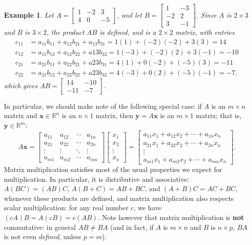 \documentclass[12pt,letterpaper]{article}
\newtheorem{eg}[theorem]{Example}
\newenvironment{example}{\begin{eg}\rm}{\end{eg}}
\newcommand{\R}{\mathbb{R}}
\newcommand{\x}{\mathbf{x}}
\newcommand{\y}{\mathbf{y}}
\newcommand{\di}{\displaystyle}
\begin{document}
\begin{example}
Let $\di A = \begin{bmatrix}
1&-2&3\\4&0&-5
\end{bmatrix}$, and let $\di B = \begin{bmatrix}
1&-3\\-2&2\\3&-1
\end{bmatrix}$. Since $A$ is $2\times 3$ and $B$ is $3\times 2$, the product $AB$ is defined, and is a $2\times 2$ matrix, with entries
\begin{align*}
c_{11} & = a_{11}b_{11}+a_{12}b_{21}+a_{13}b_{31} = 1(1)+(-2)(-2)+3(3) = 14\\
c_{12} & = a_{11}b_{12}+a_{12}b_{22}+a{13}b_{32} = 1(-3)+(-2)(2)+3(-1) = -10\\
c_{21} & = a_{21}b_{11}+a_{22}b_{21}+a{23}b_{31} = 4(1)+0(-2)+(-5)(3) = -11\\
c_{22} & = a_{21}b_{12}+a_{22}b_{22}+a{23}b_{32} = 4(-3)+0(2)+(-5)(-1) = -7,
\end{align*}
which gives $\di AB = \begin{bmatrix}
14&-10\\-11&-7
\end{bmatrix}$.
\end{example}
In particular, we should make note of the following special case: if $A$ is an $m\times n$ matrix and $\x\in \R^n$ is an $n\times 1$ matrix, then $\y=A\x$ is an $m\times 1$ matrix; that is, $\y\in\R^m$:
\[
A\x = \begin{bmatrix}
a_{11} & a_{12} & \cdots & a_{1n}\\
a_{21} & a_{22} & \cdots & a_{2n}\\
\vdots & \vdots & \ddots & \vdots\\
a_{m1} & a_{m2} & \cdots & a_{mn}
\end{bmatrix}\begin{bmatrix}
x_1\\x_2\\ \vdots \\x_n
\end{bmatrix} = \begin{bmatrix}
a_{11}x_1+a_{12}x_2+\cdots +a_{1n}x_n\\a_{21}x_1+a_{22}x_2+\cdots +a_{2n}x_n\\ \vdots\\ a_{m1}x_1+a_{m2}x_2+\cdots +a_{mn}x_n
\end{bmatrix}.
\]
Matrix multiplication satisfies most of the usual properties we expect for multiplication. In particular, it is distributive and associative: $A(BC) = (AB)C$, $A(B+C) = AB+BC$, and $(A+B)C = AC+BC$, whenever these products are defined, and matrix multiplication also respects scalar multiplication: for any real number $c$, we have $(cA)B = A(cB) = c(AB)$. Note however that matrix multiplication is {\bf not} commutative: in general $AB\neq BA$ (and in fact, if $A$ is $m\times n$ and $B$ is $n\times p$, $BA$ is not even {\em defined}, unless $p=m$).
\end{document}
